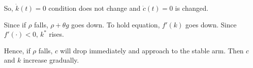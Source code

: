 \documentclass[12pt]{article}
\begin{document}
So, $ \dot{k}(t) = 0 $ condition does not change and $ \dot{c}(t) = 0 $ is changed.

Since if $ \rho $ falls, $ \rho + \theta g $ goes down. To hold equation, 
$ f'(k) $ goes down. Since $ f'(\cdot ) < 0 $, $ k ^{*} $ rises.

Hence, if $ \rho $ falls, $ c $ will drop immediately and approach to the stable arm.
Then $ c $ and $ k $ increase gradually.

\begin{figure}[H]
\end{figure}
\end{document}
